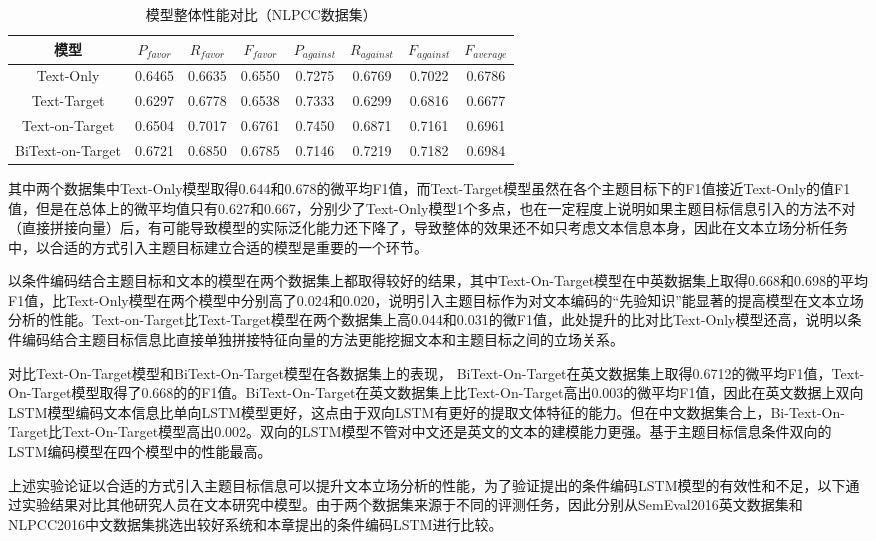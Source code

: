 \begin{table}[htbp]
	\caption[table123]{模型整体性能对比（NLPCC数据集）}
	\label{semeval_all_model}
	\vspace{0.5em}\centering\wuhao
	\begin{tabular}{cccccccc}
		\toprule[1.5pt]
		模型& $P_{favor}$&$R_{favor}$&$F_{favor}$&$P_{against}$&$R_{against}$&$F_{against}$&$F_{average}$ \\
		\midrule[1pt]
		Text-Only&0.6465&0.6635&0.6550&0.7275&0.6769&0.7022&0.6786\\
		Text-Target&0.6297&0.6778&0.6538&0.7333&0.6299&0.6816&0.6677\\
		Text-on-Target&0.6504&0.7017&0.6761&0.7450&0.6871&0.7161&0.6961\\
		BiText-on-Target&0.6721&0.6850&0.6785&0.7146&0.7219&0.7182&0.6984\\
		\bottomrule[1.5pt]
	\end{tabular}
\end{table}

其中两个数据集中Text-Only模型取得0.644和0.678的微平均F1值，而Text-Target模型虽然在各个主题目标下的F1值接近Text-Only的值F1值，但是在总体上的微平均值只有0.627和0.667，分别少了Text-Only模型1个多点，也在一定程度上说明如果主题目标信息引入的方法不对（直接拼接向量）后，有可能导致模型的实际泛化能力还下降了，导致整体的效果还不如只考虑文本信息本身，因此在文本立场分析任务中，以合适的方式引入主题目标建立合适的模型是重要的一个环节。

以条件编码结合主题目标和文本的模型在两个数据集上都取得较好的结果，其中Text-On-Target模型在中英数据集上取得0.668和0.698的平均F1值，比Text-Only模型在两个模型中分别高了0.024和0.020，说明引入主题目标作为对文本编码的“先验知识”能显著的提高模型在文本立场分析的性能。Text-on-Target比Text-Target模型在两个数据集上高0.044和0.031的微F1值，此处提升的比对比Text-Only模型还高，说明以条件编码结合主题目标信息比直接单独拼接特征向量的方法更能挖掘文本和主题目标之间的立场关系。

对比Text-On-Target模型和BiText-On-Target模型在各数据集上的表现， BiText-On-Target在英文数据集上取得0.6712的微平均F1值，Text-On-Target模型取得了0.668的的F1值。BiText-On-Target在英文数据集上比Text-On-Target高出0.003的微平均F1值，因此在英文数据上双向LSTM模型编码文本信息比单向LSTM模型更好，这点由于双向LSTM有更好的提取文体特征的能力。但在中文数据集合上，Bi-Text-On-Target比Text-On-Target模型高出0.002。双向的LSTM模型不管对中文还是英文的文本的建模能力更强。基于主题目标信息条件双向的LSTM编码模型在四个模型中的性能最高。

上述实验论证以合适的方式引入主题目标信息可以提升文本立场分析的性能，为了验证提出的条件编码LSTM模型的有效性和不足，以下通过实验结果对比其他研究人员在文本研究中模型。由于两个数据集来源于不同的评测任务，因此分别从SemEval2016英文数据集和NLPCC2016中文数据集挑选出较好系统和本章提出的条件编码LSTM进行比较。

